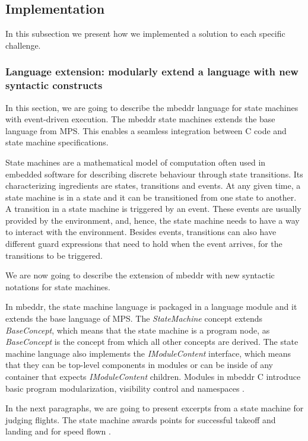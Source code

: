 \documentclass[preprint,numbers,10pt]{sigplanconf}
\begin{document}
\subsection{Implementation}

In this subsection we present how we implemented a solution to each specific challenge.

\subsubsection{Language extension: modularly extend a language with new syntactic constructs}

In this section, we are going to describe the mbeddr language for state
machines with event-driven execution. The mbeddr state machines extends
the base language from MPS. This enables a seamless integration between
C code and state machine specifications.

State machines are a mathematical model of computation often used in embedded software
for describing discrete behaviour through state transitions. Its characterizing
ingredients are states, transitions and events. At any given time, a state
machine is in a state and it can be transitioned from one state to another.
A transition in a state machine is triggered by an event. These events
are usually provided by the environment, and, hence, the state machine
needs to have a way to interact with the environment. Besides events,
transitions can also have different guard expressions that need to hold when
the event arrives, for the transitions to be triggered.

We are now going to describe the extension of mbeddr with new syntactic notations for state machines.

In mbeddr, the state machine language is packaged in a language module and it
extends the base language of MPS. The \emph{StateMachine} concept extends
\emph{BaseConcept}, which means that the state machine is a program node,
as \emph{BaseConcept} is the concept from which all other concepts are derived.
The state machine language also implements the \emph{IModuleContent} interface,
which means that they can be top-level components in modules or can be inside of any
container that expects \emph{IModuleContent} children. Modules in mbeddr C
introduce basic program modularization, visibility control and namespaces \cite{voelter2013mbeddr}.

In the next paragraphs, we are going to present excerpts from a state machine for
judging flights. The state machine awards points for successful
takeoff and landing and for speed flown \cite{voelter2014generic}.
\end{document}
